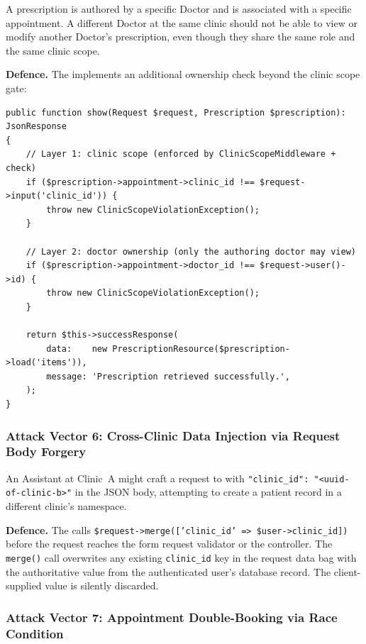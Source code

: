 A prescription is authored by a specific Doctor and is associated with
a specific appointment. A different Doctor at the same clinic should not
be able to view or modify another Doctor's prescription, even though
they share the same role and the same clinic scope.

\textbf{Defence.} The  implements an
additional ownership check beyond the clinic scope gate:

\begin{lstlisting}[style=php, caption={Cross-doctor ownership check in
  \texttt{PrescriptionController}.}]
public function show(Request $request, Prescription $prescription): JsonResponse
{
    // Layer 1: clinic scope (enforced by ClinicScopeMiddleware + check)
    if ($prescription->appointment->clinic_id !== $request->input('clinic_id')) {
        throw new ClinicScopeViolationException();
    }

    // Layer 2: doctor ownership (only the authoring doctor may view)
    if ($prescription->appointment->doctor_id !== $request->user()->id) {
        throw new ClinicScopeViolationException();
    }

    return $this->successResponse(
        data:    new PrescriptionResource($prescription->load('items')),
        message: 'Prescription retrieved successfully.',
    );
}
\end{lstlisting}

\subsubsection{Attack Vector 6: Cross-Clinic Data Injection via Request
  Body Forgery}

An Assistant at Clinic~A might craft a  request to
 with
\texttt{"clinic\_id": "<uuid-of-clinic-b>"} in the JSON body, attempting
to create a patient record in a different clinic's namespace.

\textbf{Defence.} The  calls
\texttt{\$request->merge(['clinic\_id' => \$user->clinic\_id])} before
the request reaches the form request validator or the controller. The
\texttt{merge()} call overwrites any existing \texttt{clinic\_id} key
in the request data bag with the authoritative value from the
authenticated user's database record. The client-supplied value is
silently discarded.

\subsubsection{Attack Vector 7: Appointment Double-Booking via Race Condition}

